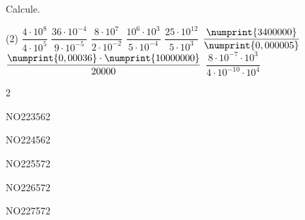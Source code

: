 \documentclass[a4paper,11pt]{report}
\begin{document}
\begin{exo}{
Calcule.
\begin{tasks}(2)
    \task $\dfrac{4\cdot10^8}{4\cdot10^5}$
    \task $\dfrac{36\cdot10^{-4}}{9\cdot10^{-5}}$
    \task $\dfrac{8\cdot10^7}{2\cdot10^{-2}}$
    \task $\dfrac{10^6\cdot10^3}{5\cdot10^{-4}}$
    \task $\dfrac{25\cdot10^{12}}{5\cdot10^3}$
    \task $\dfrac{\numprint{3400000}}{\numprint{0,000005}}$
    \task $\dfrac{\numprint{0,00036}\cdot\numprint{10000000}}{20000}$
    \task $\dfrac{8\cdot10^{-7}\cdot10^3}{4\cdot10^{-10}\cdot10^{4}}$
\end{tasks}
}{2}    
\end{exo}

\begin{exol}{NO223}{56}{2} %
\end{exol}

\begin{exol}{NO224}{56}{2} %
\end{exol}

\begin{exol}{NO225}{57}{2} %
\end{exol}

\begin{exol}{NO226}{57}{2} %
\end{exol}

\begin{exol}{NO227}{57}{2} %
\end{exol}

\begin{FLP}{65}{2}
\end{FLP}








\end{document}
